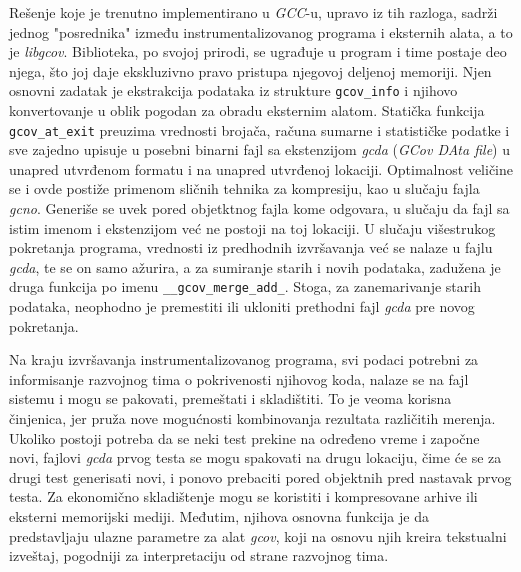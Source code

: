 \documentclass[12pt,oneside]{memoir}
\newcommand{\kod}[1]{\texttt{#1}}
\newcommand{\strano}[1]{\textit{#1}}
\begin{document}
Rešenje koje je trenutno implementirano u \strano{GCC}-u, upravo iz tih razloga, sadrži jednog "posrednika" između instrumentalizovanog programa i eksternih alata, a to je \strano{libgcov}. Biblioteka, po svojoj prirodi, se ugrađuje u program i time postaje deo njega, što joj daje ekskluzivno pravo pristupa njegovoj deljenoj memoriji. Njen osnovni zadatak je ekstrakcija podataka iz strukture \kod{gcov\_info} i njihovo konvertovanje u oblik pogodan za obradu eksternim alatom. Statička funkcija \kod{gcov\_at\_exit} preuzima vrednosti brojača, računa sumarne i statističke podatke i sve zajedno upisuje u posebni binarni fajl sa ekstenzijom \strano{gcda} (\strano{GCov DAta file}) u unapred utvrđenom formatu i na unapred utvrđenoj lokaciji. Optimalnost veličine se i ovde postiže primenom sličnih tehnika za kompresiju, kao u slučaju fajla \strano{gcno}. Generiše se uvek pored objetktnog fajla kome odgovara, u slučaju da fajl sa istim imenom i ekstenzijom već ne postoji na toj lokaciji. U slučaju višestrukog pokretanja programa, vrednosti iz predhodnih izvršavanja već se nalaze u fajlu \strano{gcda}, te se on samo ažurira, a za sumiranje starih i novih podataka, zadužena je druga funkcija po imenu \kod{\_\_gcov\_merge\_add\_}. Stoga, za zanemarivanje starih podataka, neophodno je premestiti ili ukloniti prethodni fajl \strano{gcda} pre novog pokretanja.  

Na kraju izvršavanja instrumentalizovanog programa, svi podaci potrebni za informisanje razvojnog tima o pokrivenosti njihovog koda, nalaze se na fajl sistemu i mogu se pakovati, premeštati i skladištiti. To je veoma korisna činjenica, jer pruža nove mogućnosti kombinovanja rezultata različitih merenja. Ukoliko postoji potreba da se neki test prekine na određeno vreme i započne novi, fajlovi \strano{gcda} prvog testa se mogu spakovati na drugu lokaciju, čime će se za drugi test generisati novi, i ponovo prebaciti pored objektnih pred nastavak prvog testa. Za ekonomično skladištenje mogu se koristiti i kompresovane arhive ili eksterni memorijski mediji. Međutim, njihova osnovna funkcija je da predstavljaju ulazne parametre za alat \strano{gcov}, koji na osnovu njih kreira tekstualni izveštaj, pogodniji za interpretaciju od strane razvojnog tima.
\end{document}
